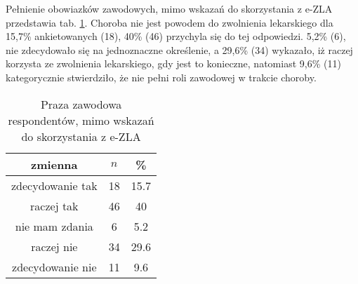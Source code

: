  Pełnienie obowiazków zawodowych, mimo wskazań do skorzystania z e-ZLA przedstawia tab. \ref{tab:Q32}. Choroba nie jest powodem do zwolnienia lekarskiego dla 15,7\% ankietowanych (18), 40\% (46) przychyla się do tej odpowiedzi. 5,2\% (6), nie zdecydowało się na jednoznaczne określenie, a 29,6\% (34) wykazało, iż raczej korzysta ze zwolnienia lekarskiego, gdy jest to konieczne, natomiast 9,6\% (11) kategorycznie stwierdziło, że nie pełni roli zawodowej w trakcie choroby.

\begin{table}[H]
\caption{Praza zawodowa respondentów, mimo wskazań do skorzystania z e-ZLA}
\centering
\begin{tabular}{ | c | c | c |}
\hline
zmienna & $n$ & \% \\
\hline
zdecydowanie tak  &  18  & 15.7 \\
\hline
raczej tak  &  46  & 40 \\
\hline
nie mam zdania  &  6  & 5.2 \\
\hline
raczej nie  &  34  & 29.6 \\
\hline
zdecydowanie nie  &  11  & 9.6 \\
\hline
\end{tabular}
\label{tab:Q32}
\end{table}
